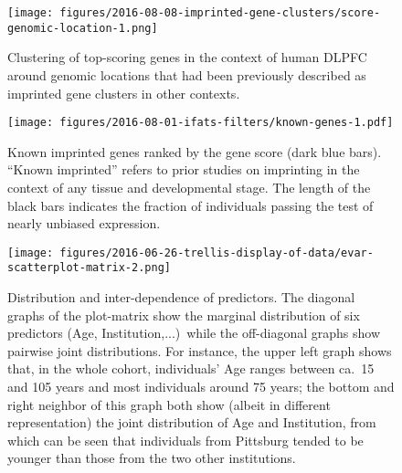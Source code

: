 \documentclass[letterpaper]{article}
\begin{document}

\setcounter{table}{0}
\makeatletter 
\renewcommand{\thetable}{S\@arabic\c@table}
\makeatother

\setcounter{figure}{0}
\makeatletter 
\renewcommand{\thefigure}{S\@arabic\c@figure}
\makeatother

\begin{figure}[h]
\begin{center}
\texttt{[image: figures/2016-08-08-imprinted-gene-clusters/score-genomic-location-1.png]}
\end{center}
\caption{
Clustering of top-scoring genes in the context of human DLPFC around genomic locations that
had been previously described as imprinted gene clusters in other contexts.
}
\label{fig:clusters}
\end{figure}

\begin{figure}[h]
\begin{center}
\texttt{[image: figures/2016-08-01-ifats-filters/known-genes-1.pdf]}
\caption{Known imprinted genes ranked by the gene score (dark blue bars).
``Known imprinted'' refers to prior studies on imprinting in the context of
any tissue and developmental stage.  The length of the
black bars indicates the fraction of individuals passing the test of nearly
unbiased expression.}
\label{fig:known-genes}
\end{center}
\end{figure}

\begin{figure}[h]
\begin{center}
\texttt{[image: figures/2016-06-26-trellis-display-of-data/evar-scatterplot-matrix-2.png]}
\end{center}
\caption{
Distribution and inter-dependence of predictors.  The diagonal graphs of the
plot-matrix show the marginal distribution of six predictors (Age,
Institution,...)~while the off-diagonal graphs show pairwise joint
distributions.  For instance, the upper left graph shows that, in the whole
cohort, individuals' Age
ranges between ca.~15 and 105 years and most individuals around 75 years; the
bottom and right neighbor of this graph both show (albeit in different
representation) the joint distribution of Age and Institution, from which can
be seen that individuals from Pittsburg tended to be younger than those from
the two other institutions.
}
\label{fig:predictor-associations}
\end{figure}
\end{document}
